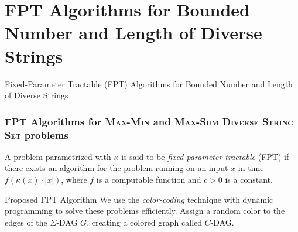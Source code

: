 \documentclass{beamer}
\begin{document}
\section{FPT Algorithms for Bounded Number and Length of Diverse Strings}
\begin{frame}
    \begin{center}
        \huge{Fixed-Parameter Tractable (FPT) Algorithms for Bounded Number and Length of Diverse Strings}
    \end{center}
\end{frame}

\begin{frame}
    \frametitle{FPT Algorithms for \textsc{Max-Min} and \textsc{Max-Sum Diverse String Set} problems}
    \begin{definition}
        A problem parametrized with $\kappa$ is said to be \emph{fixed-parameter tractable} (FPT) if there exists an algorithm for the problem running on an input $x$ in time $f(\kappa (x) \cdot |x|)$, where $f$ is a computable function and $c > 0$ is a constant.
    \end{definition}
    \begin{block}{Proposed FPT Algorithm}
        We use the \textit{color-coding} technique with dynamic programming to solve these problems efficiently. Assign a random color to the edges of the $\Sigma$-DAG $G$, creating a colored graph called $C$-DAG.
    \end{block}

\end{frame}
\end{document}
